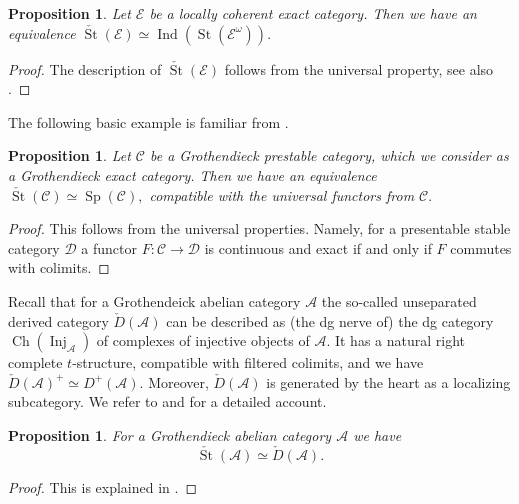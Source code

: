 \documentclass[11pt,leqno]{amsart}
\newtheorem{prop}[theo]{Proposition}
\numberwithin{equation}{section}
\newcommand{\Ch}{\operatorname{Ch}}
\newcommand{\Inj}{\operatorname{Inj}}
\newcommand{\St}{\operatorname{St}}
\newcommand{\cD}{{\mathcal D}}
\newcommand{\cA}{{\mathcal A}}
\newcommand{\cC}{{\mathcal C}}
\newcommand{\cE}{{\mathcal E}}
\newcommand{\Sp}{\operatorname{Sp}}
\newcommand{\Ind}{\operatorname{Ind}}
\begin{document}
\begin{prop}\label{prop:St_of_locally_coherent}
	Let $\cE$ be a locally coherent exact category. Then we have an equivalence $\check{\St}(\cE)\simeq \Ind(\St(\cE^{\omega})).$ 
\end{prop}

\begin{proof}
	The description of $\check{\St}(\cE)$ follows from the universal property, see also \cite[Corollary 2.24]{NW25}.
\end{proof}

The following basic example is familiar from \cite{Lur18}.

\begin{prop}\label{prop:St_of_Grothendieck_prestable}
Let $\cC$ be a Grothendieck prestable category, which we consider as a Grothendieck exact category. Then we have an equivalence $\check{\St}(\cC)\simeq\Sp(\cC),$ compatible with the universal functors from $\cC.$
\end{prop}

\begin{proof}
This follows from the universal properties. Namely, for a presentable stable category $\cD$ a functor $F:\cC\to\cD$ is continuous and exact if and only if $F$ commutes with colimits.
\end{proof}

Recall that for a Grothendeick abelian category $\cA$ the so-called unseparated derived category $\check{D}(\cA)$ can be described as (the dg nerve of) the dg category $\Ch(\Inj_{\cA})$ of complexes of injective objects of $\cA.$ It has a natural right complete $t$-structure, compatible with filtered colimits, and we have $\check{D}(\cA)^+\simeq D^+(\cA).$ Moreover, $\check{D}(\cA)$ is generated by the heart as a localizing subcategory. We refer to \cite{Kr05, Kr15} and \cite[Section C.5.8]{Lur18} for a detailed account. 

\begin{prop}\label{prop:St_of_Grothendieck_abelian}
For a Grothendieck abelian category $\cA$ we have
\begin{equation*}
\check{\St}(\cA)\simeq\check{D}(\cA).
\end{equation*}
\end{prop}

\begin{proof}
This is explained in \cite{Lur17b}.
\end{proof}
\end{document}
